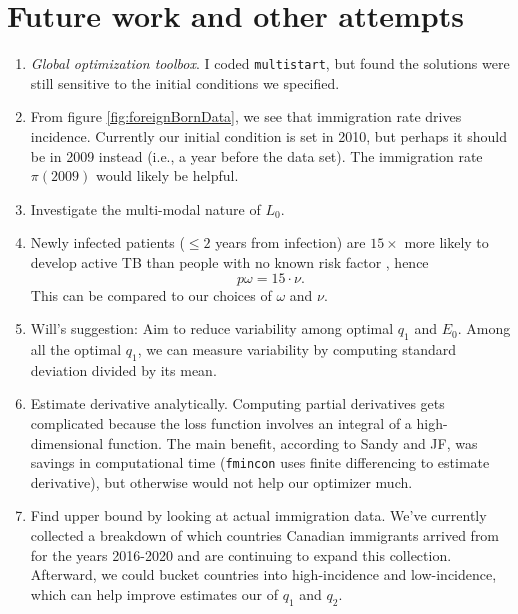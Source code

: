 \documentclass{article}
\begin{document}


	

	
	

	\section{Future work and other attempts}
	
\begin{enumerate}
		\item \emph{Global optimization toolbox}.  I coded \texttt{multistart}, but found the solutions were still sensitive to the initial conditions we specified. 
	\item From figure \ref{fig:foreignBornData}, we see that immigration rate drives incidence.  Currently our initial condition is set in 2010, but perhaps it should be in 2009 instead (i.e., a year before the data set).  The immigration rate $\pi(2009)$ would likely be helpful.
	\item Investigate the multi-modal nature of $L_0$.
	\item Newly infected patients ($\leq2$ years from infection) are $15\times$ more likely to develop active TB than people with no known risk factor \cite{PublicHealthAgencyofCanada2014CanadianStandards}, hence $$ p\omega = 15 \cdot \nu . $$  This can be compared to our choices of $\omega$ and $\nu$.
	
	
	\item Will's suggestion:  Aim to reduce variability among optimal $q_1$ and $E_0$.  Among all the optimal $q_1$, we can measure variability by computing standard deviation divided by its mean. 

		\item Estimate derivative analytically.  Computing partial derivatives gets complicated because the loss function involves an integral of a high-dimensional function.  The main benefit, according to Sandy and JF, was savings in computational time (\texttt{fmincon} uses finite differencing to estimate derivative), but otherwise would not help our optimizer much.
		
\item Find upper bound by looking at actual immigration data.  We've currently collected a breakdown of which countries Canadian immigrants arrived from for the years 2016-2020 and are continuing to expand this collection.  Afterward, we could bucket countries into high-incidence and low-incidence, which can help improve estimates our of $q_1$ and $q_2$.
	
\end{enumerate}
\end{document}

